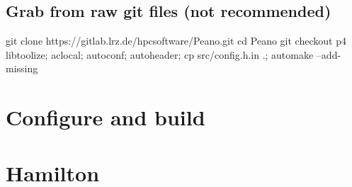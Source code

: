 \subsection{Grab from raw git files (not recommended)}

\begin{code}
 git clone https://gitlab.lrz.de/hpcsoftware/Peano.git
 cd Peano
 git checkout p4
 libtoolize; aclocal; autoconf; autoheader; cp src/config.h.in .; automake --add-missing
\end{code}

\section{Configure and build}





\section{Hamilton}
